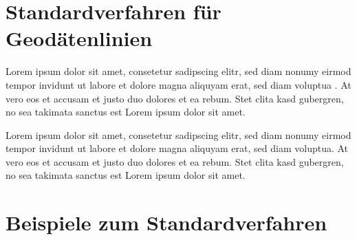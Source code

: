 %
%
%
%
\section{Standardverfahren für Geodätenlinien
\label{geodaeten:section:Standardverfahren}}

Lorem ipsum dolor sit amet, consetetur sadipscing elitr, sed diam
nonumy eirmod tempor invidunt ut labore et dolore magna aliquyam
erat, sed diam voluptua \cite{geodaeten:bibtex}.
At vero eos et accusam et justo duo dolores et ea rebum.
Stet clita kasd gubergren, no sea takimata sanctus est Lorem ipsum
dolor sit amet.

Lorem ipsum dolor sit amet, consetetur sadipscing elitr, sed diam
nonumy eirmod tempor invidunt ut labore et dolore magna aliquyam
erat, sed diam voluptua.
At vero eos et accusam et justo duo dolores et ea rebum.  Stet clita
kasd gubergren, no sea takimata sanctus est Lorem ipsum dolor sit
amet.


\section{Beispiele zum Standardverfahren 
\label{geodaeten:section:StandardverfahrenBeispiele}}




